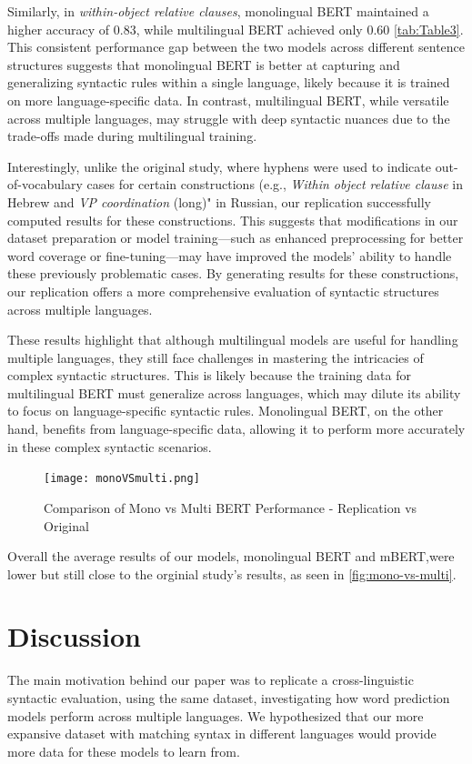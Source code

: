 \documentclass[11pt]{article}
\begin{document}
Similarly, in \textit{within-object relative clauses}, monolingual BERT maintained a higher accuracy of 0.83, while multilingual BERT achieved only 0.60 \autoref{tab:Table3}. This consistent performance gap between the two models across different sentence structures suggests that monolingual BERT is better at capturing and generalizing syntactic rules within a single language, likely because it is trained on more language-specific data. In contrast, multilingual BERT, while versatile across multiple languages, may struggle with deep syntactic nuances due to the trade-offs made during multilingual training.


Interestingly, unlike the original study, where hyphens were used to indicate out-of-vocabulary cases for certain constructions (e.g., \textit{Within object relative clause} in Hebrew and \textit{VP coordination} (long)" in Russian, our replication successfully computed results for these constructions. This suggests that modifications in our dataset preparation or model training—such as enhanced preprocessing for better word coverage or fine-tuning—may have improved the models' ability to handle these previously problematic cases. By generating results for these constructions, our replication offers a more comprehensive evaluation of syntactic structures across multiple languages.

These results highlight that although multilingual models are useful for handling multiple languages, they still face challenges in mastering the intricacies of complex syntactic structures. This is likely because the training data for multilingual BERT must generalize across languages, which may dilute its ability to focus on language-specific syntactic rules. Monolingual BERT, on the other hand, benefits from language-specific data, allowing it to perform more accurately in these complex syntactic scenarios.

\begin{figure}[htbp]
    \centering
    \texttt{[image: monoVSmulti.png]}
    \caption{Comparison of Mono vs Multi BERT Performance - Replication vs Original}
    \label{fig:mono-vs-multi}
\end{figure}

Overall the average results of our models, monolingual BERT and mBERT,were lower but still close to the orginial study's results, as seen in \autoref{fig:mono-vs-multi}.

\section{Discussion}
The main motivation behind our paper was to replicate a cross-linguistic syntactic evaluation, using the same dataset, investigating how word prediction models perform across multiple languages. We hypothesized that our more expansive dataset with matching syntax in different languages would provide more data for these models to learn from. 
\end{document}
